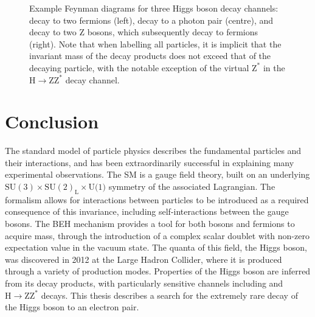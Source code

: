 \begin{figure}
\begin{subfigure}[htbp!]{0.33\textwidth}
        \end{subfigure}\hfill
    \caption[Example Feynman diagrams for a selection of Higgs boson decays.]{Example Feynman diagrams for three Higgs boson decay channels: decay to two fermions (left), decay to a photon pair (centre), and decay to two $\mathrm{Z}$ bosons, which subsequently decay to fermions (right). Note that when labelling all particles, it is implicit that the invariant mass of the decay products does not exceed that of the decaying particle, with the notable exception of the virtual $\mathrm{Z}^{*}$ in the $\mathrm{H}\rightarrow \mathrm{Z}\mathrm{Z}^{*}$ decay channel.}
    \label{fig:higgs_decay_feynmans}
\end{figure}

\section{Conclusion}

The standard model of particle physics describes the fundamental particles and their interactions, and has been extraordinarily successful in explaining many experimental observations. The SM is a gauge field theory, built on an underlying $\mathrm{SU(3)}\times \mathrm{SU(2)_{L}} \times \mathrm{U(1})$ symmetry of the associated Lagrangian. The formalism allows for interactions between particles to be introduced as a required consequence of this invariance, including self-interactions between the gauge bosons. The BEH mechanism provides a tool for both bosons and fermions to acquire mass, through the introduction of a complex scalar doublet with non-zero expectation value in the vacuum state. The quanta of this field, the Higgs boson, was discovered in 2012 at the Large Hadron Collider, where it is produced through a variety of production modes. Properties of the Higgs boson are inferred from its decay products, with particularly sensitive channels including \Hgg and $\mathrm{H}\rightarrow \mathrm{Z}\mathrm{Z}^{*}$ decays. This thesis describes a search for the extremely rare decay of the Higgs boson to an electron pair.

